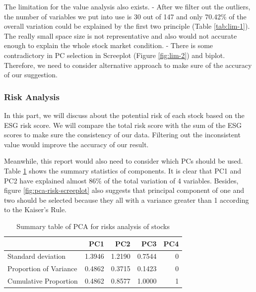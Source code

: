 \documentclass[11pt,a4paper,]{article}
\begin{document}
The limitation for the value analysis also exists.
- After we filter out the outliers, the number of variables we put into use is 30 out of 147 and only 70.42\% of the overall variation could be explained by the first two principle (Table \ref{tab:lim-1}). The really small space size is not representative and also would not accurate enough to explain the whole stock market condition.
- There is some contradictory in PC selection in Screeplot (Figure \ref{fig:lim-2}) and biplot.
Therefore, we need to consider alternative approach to make sure of the accuracy of our suggestion.

\hypertarget{risk-analysis}{%
\subsubsection{Risk Analysis}\label{risk-analysis}}

In this part, we will discuss about the potential risk of each stock based on the ESG risk score. We will compare the total risk score with the sum of the ESG scores to make sure the consistency of our data. Filtering out the inconsistent value would improve the accuracy of our result.

Meanwhile, this report would also need to consider which PCs should be used. Table \ref{tab:pca-risk-summary} shows the summary statistics of components. It is clear that PC1 and PC2 have explained almost 86\% of the total variation of 4 variables. Besides, figure \ref{fig:pca-risk-screeplot} also suggests that principal component of one and two should be selected because they all with a variance greater than 1 according to the Kaiser's Rule.

\begin{table}

\caption{\label{tab:pca-risk-summary}Summary table of PCA for risks analysis of stocks}
\centering
\begin{tabular}[t]{l|r|r|r|r}
\hline
  & PC1 & PC2 & PC3 & PC4\\
\hline
Standard deviation & 1.3946 & 1.2190 & 0.7544 & 0\\
\hline
Proportion of Variance & 0.4862 & 0.3715 & 0.1423 & 0\\
\hline
Cumulative Proportion & 0.4862 & 0.8577 & 1.0000 & 1\\
\hline
\end{tabular}
\end{table}
\end{document}
